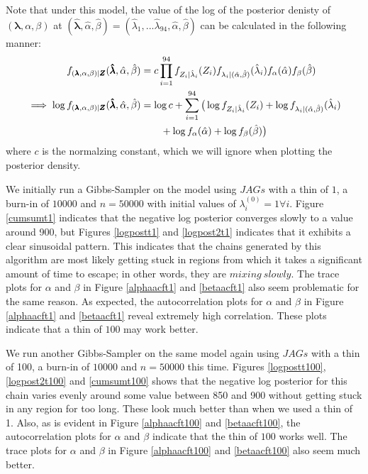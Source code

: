 \documentclass[12pt, leqno]{article}
\begin{document}
Note that under this model, the value of the log of the posterior
denisty of $(\pmb{\lambda},{\alpha},{\beta})$ at
$(\pmb{\hat{\lambda}},\hat{\alpha},\hat{\beta}) =
(\hat{\lambda}_1,... \hat{\lambda}_{94},\hat{\alpha},\hat{\beta})$ can
be calculated in the following manner:
\begin{align}
f_{(\pmb{\lambda},{\alpha},{\beta})|\pmb{Z}} (\pmb{\hat{\lambda}},\hat{\alpha},\hat{\beta}) &=
c \prod_{i=1}^{94} f_{Z_i|\hat{\lambda}_i}(Z_i)
f_{\lambda_i|(\hat{\alpha},\hat{\beta})}(\hat{\lambda}_i)
f_{{\alpha}}(\hat{\alpha}) f_{{\beta}}(\hat{\beta})\notag \\
\implies \log f_{(\pmb{\lambda},{\alpha},{\beta})|\pmb{Z}} (\pmb{\hat{\lambda}},\hat{\alpha},\hat{\beta}) 
&= \log c + 
\sum_{i=1}^{94} \big(\log f_{Z_i|\hat{\lambda}_i}(Z_i) + 
\log f_{\lambda_i|(\hat{\alpha},\hat{\beta})}(\hat{\lambda}_i)
\notag \\ 
&\qquad + \log f_{{\alpha}}(\hat{\alpha}) + \log
f_{{\beta}}(\hat{\beta}) \big)
\notag 
\end{align}
where $c$ is the normalzing constant, which we will ignore when
plotting the posterior density.

We initially run a Gibbs-Sampler on the model using $JAGs$ with a thin of $1$, a burn-in of $10000$ and
$n=50000$ with initial values of $\lambda_i^{(0)} = 1 \forall i$. Figure \ref{cumsumt1}
indicates that the negative log posterior converges slowly
to a value around 900, but Figures \ref{logpostt1} and \ref{logpost2t1} indicates
that it exhibits a clear
sinusoidal pattern. This
indicates that the chains generated by this algorithm are most
likely getting stuck in regions from which it takes a significant
amount of time to escape; in other words, they are $mixing \: slowly$.  The trace plots for $\alpha$ and $\beta$ in Figure \ref{alphaacft1}
and \ref{betaacft1} also seem problematic for the same reason. As expected, the
autocorrelation plots for $\alpha$ and $\beta$ in
Figure \ref{alphaacft1} and \ref{betaacft1}
reveal extremely high
correlation. These plots indicate that a thin of $100$ may work better. 

We run another Gibbs-Sampler on the same model again using $JAGs$ with a thin of 100, a burn-in of $10000$ and
$n=50000$ this time. Figures \ref{logpostt100}, \ref{logpost2t100} and
\ref{cumsumt100} shows that the negative log posterior for this chain
varies evenly around some value between 850 and 900 without getting stuck in any region for too
long. These look much better than when we used a thin of 1. Also, as
is evident in
Figure \ref{alphaacft100} and \ref{betaacft100}, the
autocorrelation plots for $\alpha$ and $\beta$ indicate that the thin
of $100$ works well. The trace plots for $\alpha$ and $\beta$ in Figure \ref{alphaacft100}
and \ref{betaacft100} also seem much better. 
\end{document}
